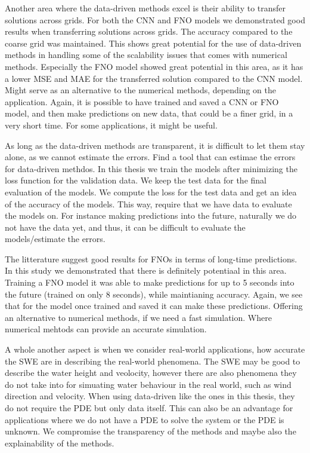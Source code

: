 Another area where the data-driven methods excel is their ability to transfer solutions across grids. 
For both the CNN and FNO models we demonstrated good results when transferring solutions across grids.
The accuracy compared to the coarse grid was maintained.
This shows great potential for the use of data-driven methods in handling some of the scalability issues that comes with numerical methods.
Especially the FNO model showed great potential in this area, as it has a lower MSE and MAE for the transferred solution compared to the CNN model.
Might serve as an alternative to the numerical methods, depending on the application.
Again, it is possible to have trained and saved a CNN or FNO model, and then make predictions on new data, that could be a finer grid, in a very short time.
For some applications, it might be useful.

As long as the data-driven methods are transparent, it is difficult to let them stay alone, as we cannot estimate the errors.
Find a tool that can estimae the errors for data-driven methdos.
In this thesis we train the models after minimizing the loss function for the validation data.
We keep the test data for the final evaluation of the models.
We compute the loss for the test data and get an idea of the accuracy of the models.
This way, require that we have data to evaluate the models on.
For instance making predictions into the future, naturally we do not have the data yet, and thus, it can be difficult to evaluate the models/estimate the errors.

The litterature suggest good results for FNOs in terms of long-time predictions.
In this study we demonstrated that there is definitely potentiaal in this area.
Training a FNO model it was able to make predictions for up to 5 seconds into the future (trained on only 8 seconds), while maintianing accuracy.
Again, we see that for the model once trained and saved it can make these predictions.
Offering an alternative to numerical methods, if we need a fast simulation.
Where numerical mehtods can provide an accurate simulation.

A whole another aspect is when we consider real-world applications, how accurate the SWE are in describing the real-world phenomena.
The SWE may be good to describe the water height and veolocity, however there are also phenomena they do not take into for simuating water behaviour in the real world, such as wind direction and velocity.
When using data-driven like the ones in this thesis, they do not require the PDE but only data itself.
This can also be an advantage for applications where we do not have a PDE to solve the system or the PDE is unknown.
We compromise the transparency of the methods and maybe also the explainability of the methods.

